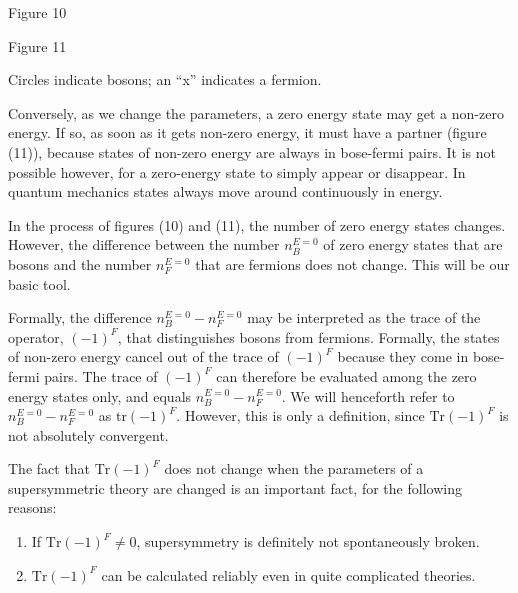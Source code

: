 \documentclass[11pt,a4paper]{article}
\begin{document}
\begin{center}

\par\smallskip
Figure 10
\end{center}

\begin{center}

\par\smallskip
Figure 11
\par\smallskip
Circles indicate bosons; an ``x'' indicates a fermion.
\end{center}

Conversely, as we change the parameters, a zero energy
state may get a non-zero energy. If so, as soon as it gets non-zero
energy, it must have a partner (figure (11)), because states
of non-zero energy are always in bose-fermi pairs. It is not possible
however, for a zero-energy state to simply appear or disappear.
In quantum mechanics states always move around continuously in
energy.\begingroup\renewcommand{\thefootnote}{\fnsymbol{footnote}}\footnotemark[1]\endgroup

In the process of figures (10) and (11), the number of zero
energy states changes. However, the difference between the number
$n_B^{E=0}$ of zero energy states that are bosons and the number $n_F^{E=0}$
that are fermions does not change. This will be our basic tool.

Formally, the difference $n_B^{E=0} - n_F^{E=0}$ may be interpreted as
the trace of the operator, $(-1)^F$, that distinguishes bosons from
fermions. Formally, the states of non-zero energy cancel out of the
trace of $(-1)^F$ because they come in bose-fermi pairs. The trace of
$(-1)^F$ can therefore be evaluated among the zero energy states only,
and equals $n_B^{E=0} - n_F^{E=0}$. We will henceforth refer to $n_B^{E=0} - n_F^{E=0}$
as $\mathrm{tr}(-1)^F$. However, this is only a definition, since $\mathrm{Tr}(-1)^F$ is
not absolutely convergent.

The fact that $\mathrm{Tr}(-1)^F$ does not change when the parameters of a
supersymmetric theory are changed is an important fact, for the following
reasons:

\begin{enumerate}
\item[(1)] If $\mathrm{Tr}(-1)^F \neq 0$, supersymmetry is definitely not spontaneously broken.
\item[(2)] $\mathrm{Tr}(-1)^F$ can be calculated reliably even in quite complicated theories.
\end{enumerate}
\end{document}
